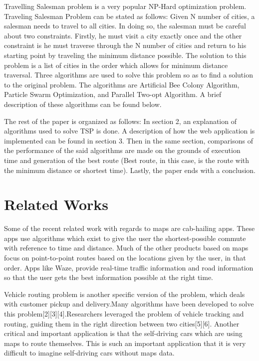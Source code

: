 \documentclass[conference]{IEEEtran}
\begin{document}
Travelling Salesman problem is a very popular NP-Hard optimization problem. Traveling Salesman Problem can be stated as follows: Given N number of cities, a salesman needs to travel to all cities. In doing so, the salesman must be careful about two constraints. Firstly, he must visit a city exactly once and the other constraint is he must traverse through the N number of cities and return to his starting point by traveling the minimum distance possible. The solution to this problem is a list of cities in the order which allows for minimum distance traversal. Three algorithms are used to solve this problem so as to find a solution to the original problem. The algorithms are Artificial Bee Colony Algorithm, Particle Swarm Optimization, and Parallel Two-opt Algorithm. A brief description of these algorithms can be found below.
\linebreak
\par
The rest of the paper is organized as follows: In section 2, an explanation of algorithms used to solve TSP is done. A description of how the web application is implemented can be found in section 3. Then in the same section, comparisons of the performance of the said algorithms are made on the grounds of execution time and generation of the best route (Best route, in this case, is the route with the minimum distance or shortest time). Lastly, the paper ends with a conclusion.

\section {Related Works}
Some of the recent related work with regards to maps are cab-hailing apps. These apps use algorithms which exist to give the user the shortest-possible commute with reference to time and distance. Much of the other products based on maps focus on point-to-point routes based on the locations given by the user, in that order. Apps like Waze, provide real-time traffic information and road information so that the user gets the best information possible at the right time.

Vehicle routing problem is another specific version of the problem, which deals with customer pickup and delivery.Many algorithms have been developed to solve this problem[2][3][4].Researchers leveraged the problem of vehicle tracking and routing, guiding them in the right direction between two cities[5][6]. Another critical and important application is that the self-driving cars which are using maps to route themselves. This is such an important application that it is very difficult to imagine self-driving cars without maps data.
\end{document}
